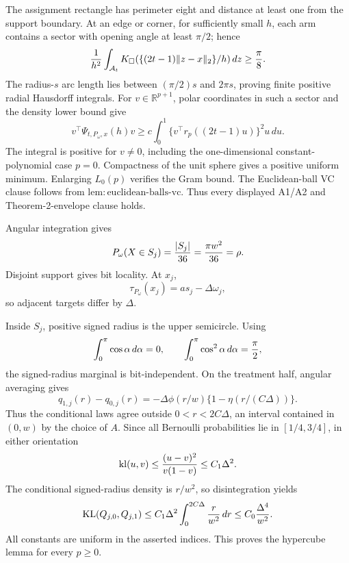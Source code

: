 The assignment rectangle has perimeter eight and distance at least one from the support boundary.  At an edge or corner, for sufficiently small \(h\), each arm contains a sector with opening angle at least \(\pi/2\); hence
\[
 {1\over h^2}\int_{\mathcal A_t}K_\square(\{(2t-1)\|z-x\|_2\}/h)\,dz\geq{\pi\over8}.
\]
The radius-\(s\) arc length lies between \((\pi/2)s\) and \(2\pi s\), proving finite positive radial Hausdorff integrals.  For \(v\in\mathbb R^{p+1}\), polar coordinates in such a sector and the density lower bound give
\[
 v^\top\Psi_{t,P_\omega,x}(h)v
 \geq c\int_0^1\{v^\top r_p((2t-1)u)\}^2u\,du.
\]
The integral is positive for \(v\ne0\), including the one-dimensional constant-polynomial case \(p=0\).  Compactness of the unit sphere gives a positive uniform minimum.  Enlarging \(L_0(p)\) verifies the Gram bound.  The Euclidean-ball VC clause follows from \(\mathrm{lem:euclidean\text{-}balls\text{-}vc}\).  Thus every displayed A1/A2 and Theorem-2-envelope clause holds.

Angular integration gives
\[
 P_\omega(X\in S_j)={|S_j|\over36}={\pi w^2\over36}=\rho.
\]
Disjoint support gives bit locality.  At \(x_j\),
\[
 \tau_{P_\omega}(x_j)=as_j-\Delta\omega_j,
\]
so adjacent targets differ by \(\Delta\).

Inside \(S_j\), positive signed radius is the upper semicircle.  Using
\[
 \int_0^\pi\cos\alpha\,d\alpha=0,
 \qquad \int_0^\pi\cos^2\alpha\,d\alpha={\pi\over2},
\]
the signed-radius marginal is bit-independent.  On the treatment half, angular averaging gives
\[
 q_{1,j}(r)-q_{0,j}(r)
 =-\Delta\phi(r/w)\{1-\eta(r/(C\Delta))\}.
\]
Thus the conditional laws agree outside \(0<r<2C\Delta\), an interval contained in \((0,w)\) by the choice of \(A\).  Since all Bernoulli probabilities lie in \([1/4,3/4]\), in either orientation
\[
 \operatorname{kl}(u,v)\leq{(u-v)^2\over v(1-v)}\leq C_1\Delta^2.
\]
The conditional signed-radius density is \(r/w^2\), so disintegration yields
\[
 \operatorname{KL}(Q_{j,0},Q_{j,1})
 \leq C_1\Delta^2\int_0^{2C\Delta}{r\over w^2}\,dr
 \leq C_0{\Delta^4\over w^2}.
\]
All constants are uniform in the asserted indices.  This proves the hypercube lemma for every \(p\geq0\).